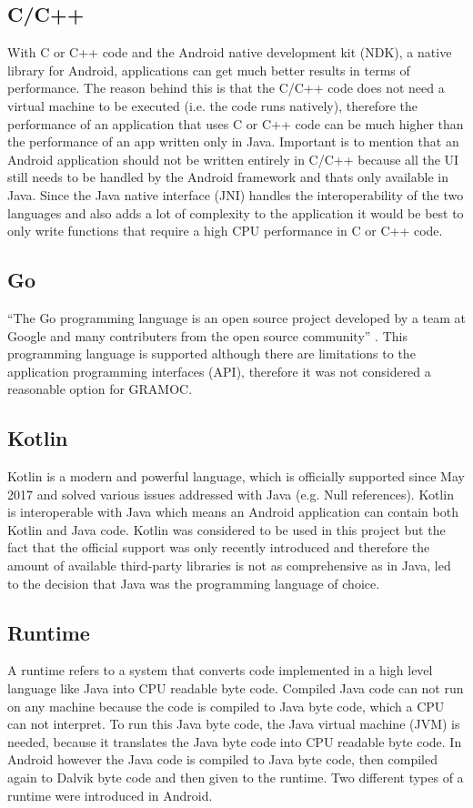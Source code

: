 \subsection{C/C++}
With C or C++ code and the Android native development kit (NDK), a native library for Android, applications can get much better results in terms of performance. The reason behind this is that the C/C++ code does not need a virtual machine to be executed (i.e. the code runs natively), therefore the performance of an application that uses C or C++ code can be much higher than the performance of an app written only in Java. Important is to mention that an Android application should not be written entirely in C/C++ because all the UI still needs to be handled by the Android framework and thats only available in Java. Since the Java native interface (JNI) handles the interoperability of the two languages and also adds a lot of complexity to the application it would be best to only write functions that require a high CPU performance in C or C++ code.

\subsection{Go}
``The Go programming language is an open source project developed by a team at Google and many contributers from the open source community'' \autocite{GoProject}. This programming language is supported although there are limitations to the application programming interfaces (API), therefore it was not considered a reasonable option for GRAMOC.

\subsection{Kotlin}
Kotlin is a modern and powerful language, which is officially supported since May 2017 and solved various issues addressed with Java (e.g. Null references). Kotlin is interoperable with Java which means an Android application can contain both Kotlin and Java code. Kotlin was considered to be used in this project but the fact that the official support was only recently introduced and therefore the amount of available third-party libraries is not as comprehensive as in Java, led to the decision that Java was the programming language of choice.

\subsection{Runtime}
A runtime refers to a system that converts code implemented in a high level language like Java into CPU readable byte code. Compiled Java code can not run on any machine because the code is compiled to Java byte code, which a CPU can not interpret. To run this Java byte code, the Java virtual machine (JVM) is needed, because it translates the Java byte code into CPU readable byte code. In Android however the Java code is compiled to Java byte code, then compiled again to Dalvik byte code and then given to the runtime. Two different types of a runtime were introduced in Android.

